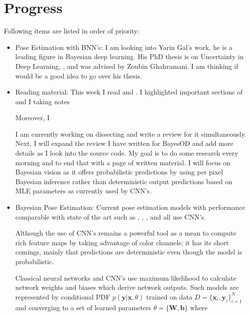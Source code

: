 \documentclass[11pt]{article}
\begin{document}
\section{Progress}
Following items are listed in order of priority:
\begin{itemize}
	\item Pose Estimation with BNN's: I am looking into Yarin Gal's work, he is 
	a leading figure in Bayesian deep learning. His PhD thesis is on Uncertainty
	 in Deep Learning, \cite{gal2016uncertainty}, and was advised by Zoubin 
	Ghahramani. I am thinking if would be a good idea to go over his thesis.  

	\item Reading material: This week I read \cite{sunderhauf2018limits} and 
	\cite{kendall2017uncertainties}. I highlighted important sections of 
	\cite{sunderhauf2018limits} and I taking notes 

	Moreover, I 
	
	I am currently working on dissecting 
	\cite{kendall2017uncertainties} and write a review for it simultaneously. 
	Next, I will expand the review I have written for BayesOD and add more 
	details as I look into the source code. My goal is to do some research every
	morning and to end that with a page of written material. I will focus on 
	Bayesian vision as it offers probabilistic predictions by using per pixel
	Bayesian inference rather than deterministic output predictions based on MLE
	 parameters as currently used by CNN's. 
	
	
	\item Bayesian Pose Estimation: Current pose estimation models with 
	performance comparable with state of the art such as \cite{posecnn}, 
	\cite{Dope}, \cite{MoreFusion}, and \cite{DenseFusion} all use CNN's. 
	
	Although the use of CNN's remains a powerful tool as a mean to compute rich 
	feature maps by taking advantage of color channels; it has its short 
	comings, mainly that predictions are deterministic even though the model 
	is probabilistic. 
	
	Classical neural networks and CNN's use maximum likelihood to calculate 
	network weights and biases which derive network outputs. Such models are 
	represented by conditional PDF \( p(\textbf{y} | \textbf{x}, \theta) \) 
	trained on data \( D = \{ \textbf{x}_{i},\textbf{y}_{i} \}_{i = 1}^{N} \) 
	and converging to a set of learned parameters 
	\( \theta = \{ \textbf{W}, \textbf{b} \}\) where


\end{itemize}
\end{document}
